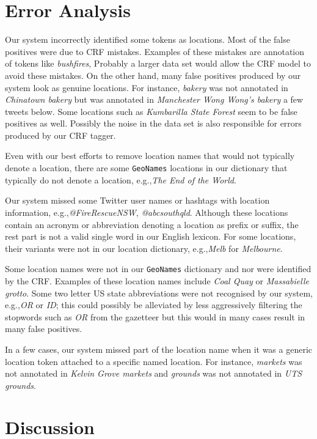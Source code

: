\documentclass[11pt]{article}
\newcommand{\eg}{e.g.,\xspace}
\newcommand{\geoname}{\texttt{GeoNames}\xspace}
\newcommand{\myex}[1]{\textit{#1}}
\begin{document}
\section{Error Analysis}
\label{sec:error_analysis}

Our system incorrectly identified some tokens as locations.
Most of the false positives were due to CRF mistakes.
Examples of these mistakes are annotation of tokens like \myex{bushfires}, 
Probably a larger data set would allow the CRF model to avoid these mistakes.
On the other hand, many false positives produced by our system look as genuine locations.
For instance, \myex{bakery} was not annotated in \myex{Chinatown bakery} but was annotated in \myex{Manchester Wong Wong's bakery} a few tweets below.
Some locations such as \myex{Kumbarilla State Forest} seem to be false positives as well.
Possibly the noise in the data set is also responsible for errors produced by our CRF tagger.


Even with our best efforts to remove location names that would not typically denote a location, there are some \geoname locations in our dictionary that typically do not denote a location, \eg \myex{The End of the World}.

Our system missed some Twitter user names or hashtags with location information, \eg \myex{@FireRescueNSW}, \myex{@abcsouthqld}.
Although these locations contain an acronym or abbreviation denoting a location as prefix or suffix, the rest part is not a valid single word in our English lexicon.
For some locations, their variants were not in our location dictionary, \eg \myex{Melb} for \myex{Melbourne}.

Some location names were not in our \geoname dictionary and nor were identified by the CRF.
Examples of these location names include \myex{Coal Quay} or \myex{Massabielle grotto}.
Some two letter US state abbreviations were not recognised by our system, \eg \myex{OR} or \myex{ID}; this could possibly be alleviated by less aggressively filtering the stopwords such as \myex{OR} from the gazetteer but this would in many cases result in many false positives.

In a few cases, our system missed part of the location name when it was a generic location token attached to a specific named location.
For instance, \myex{markets} was not annotated in \myex{Kelvin Grove markets} and \myex{grounds} was not annotated in \myex{UTS grounds}.

\section{Discussion}
\label{sec:discussion}
\end{document}
